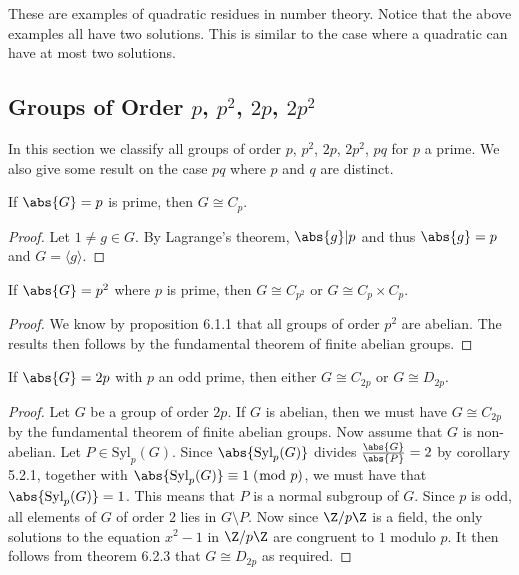\documentclass[a4paper]{article}
\begin{document}
These are examples of quadratic residues in number theory. Notice that the above examples all have two solutions. This is similar to the case where a quadratic can have at most two solutions. 

\subsection{Groups of Order $p$, $p^2$, $2p$, $2p^2$}
In this section we classify all groups of order $p$, $p^2$, $2p$, $2p^2$, $pq$ for $p$ a prime. We also give some result on the case $pq$ where $p$ and $q$ are distinct. 

\begin{prp}{}{} If $\abs{G}=p$ is prime, then $G\cong C_p$. \tcbline
\begin{proof}
Let $1\neq g\in G$. By Lagrange's theorem, $\abs{g}|p$ and thus $\abs{g}=p$ and $G=\langle g\rangle$. 
\end{proof}
\end{prp}

\begin{prp}{}{} If $\abs{G}=p^2$ where $p$ is prime, then $G\cong C_{p^2}$ or $G\cong C_p\times C_p$. \tcbline
\begin{proof}
We know by proposition 6.1.1 that all groups of order $p^2$ are abelian. The results then follows by the fundamental theorem of finite abelian groups. 
\end{proof}
\end{prp}

\begin{prp}{}{} If $\abs{G}=2p$ with $p$ an odd prime, then either $G\cong C_{2p}$ or $G\cong D_{2p}$. \tcbline
\begin{proof}
Let $G$ be a group of order $2p$. If $G$ is abelian, then we must have $G\cong C_{2p}$ by the fundamental theorem of finite abelian groups. Now assume that $G$ is non-abelian. Let $P\in\text{Syl}_p(G)$. Since $\abs{\text{Syl}_p(G)}$ divides $\frac{\abs{G}}{\abs{P}}=2$ by corollary 5.2.1, together with $\abs{\text{Syl}_p(G)}\equiv 1\;(\bmod\;p)$, we must have that $\abs{\text{Syl}_p(G)}=1$. This means that $P$ is a normal subgroup of $G$. Since $p$ is odd, all elements of $G$ of order $2$ lies in $G\setminus P$. Now since $\Z/p\Z$ is a field, the only solutions to the equation $x^2-1$ in $\Z/p\Z$ are congruent to $1$ modulo $p$. It then follows from theorem 6.2.3 that $G\cong D_{2p}$ as required. 
\end{proof}
\end{prp}
\end{document}
